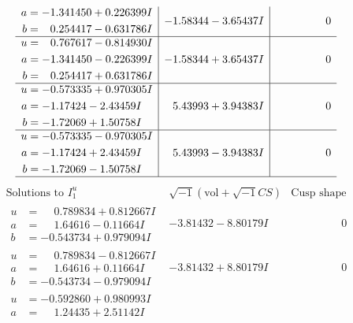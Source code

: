 \documentclass[1p]{elsarticle_modified}
\theoremstyle{definition}
\newcommand{\I}{\sqrt{-1}}
\begin{document}
$$\begin{array}{c|c|c}
\begin{aligned}
a &= -1.341450 + 0.226399 I \\
b &= \phantom{-}0.254417 - 0.631786 I\end{aligned}
 & -1.58344 - 3.65437 I & \phantom{-0.000000 } 0 \\ \hline\begin{aligned}
u &= \phantom{-}0.767617 - 0.814930 I \\
a &= -1.341450 - 0.226399 I \\
b &= \phantom{-}0.254417 + 0.631786 I\end{aligned}
 & -1.58344 + 3.65437 I & \phantom{-0.000000 } 0 \\ \hline\begin{aligned}
u &= -0.573335 + 0.970305 I \\
a &= -1.17424 - 2.43459 I \\
b &= -1.72069 + 1.50758 I\end{aligned}
 & \phantom{-}5.43993 + 3.94383 I & \phantom{-0.000000 } 0 \\ \hline\begin{aligned}
u &= -0.573335 - 0.970305 I \\
a &= -1.17424 + 2.43459 I \\
b &= -1.72069 - 1.50758 I\end{aligned}
 & \phantom{-}5.43993 - 3.94383 I & \phantom{-0.000000 } 0\\
 \hline 
 \end{array}$$\newpage$$\begin{array}{c|c|c}  
\text{Solutions to }I^u_{1}& \I (\text{vol} + \sqrt{-1}CS) & \text{Cusp shape}\\
 \hline 
\begin{aligned}
u &= \phantom{-}0.789834 + 0.812667 I \\
a &= \phantom{-}1.64616 - 0.11664 I \\
b &= -0.543734 + 0.979094 I\end{aligned}
 & -3.81432 - 8.80179 I & \phantom{-0.000000 } 0 \\ \hline\begin{aligned}
u &= \phantom{-}0.789834 - 0.812667 I \\
a &= \phantom{-}1.64616 + 0.11664 I \\
b &= -0.543734 - 0.979094 I\end{aligned}
 & -3.81432 + 8.80179 I & \phantom{-0.000000 } 0 \\ \hline\begin{aligned}
u &= -0.592860 + 0.980993 I \\
a &= \phantom{-}1.24435 + 2.51142 I \\

\end{aligned}
\end{array}$$
\end{document}
